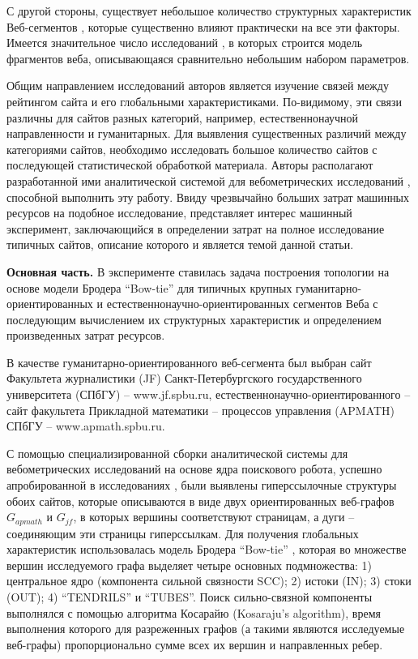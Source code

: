 С другой стороны, существует небольшое количество структурных характеристик Веб-сегментов \cite{ChoRoy}, которые существенно влияют практически на все эти факторы. Имеется значительное число исследований \cite{Kleinberg,ChoRoy,BroderKumarMaghoul,AguilloGranadinoOrtega,StuartThelwallHarries,Chakrabarti,Thelwall,Pechnikov,PechnikovNwohiri}, в которых строится модель фрагментов веба, описывающаяся сравнительно небольшим набором параметров.

Общим направлением исследований авторов является изучение связей между рейтингом сайта и его глобальными характеристиками. По-видимому, эти связи различны для сайтов разных категорий, например, естественнонаучной направленности и гуманитарных. Для выявления существенных различий между категориями сайтов, необходимо исследовать большое количество сайтов с последующей статистической обработкой материала. Авторы располагают разработанной ими аналитической системой для вебометрических исследований \cite{BlekanovSergeevMaksimov,BlekanovSergeevMartynenko}, способной выполнить эту работу. Ввиду чрезвычайно больших затрат машинных ресурсов на подобное исследование, представляет интерес машинный эксперимент, заключающийся в определении затрат на полное исследование типичных сайтов, описание которого и является темой данной статьи.

\textbf{Основная часть.} В эксперименте ставилась задача построения топологии на основе модели Бродера “Bow-tie” \cite{BroderKumarMaghoul,Thelwall} для типичных крупных гуманитарно-ориентированных и естественнонаучно-ориентированных сегментов Веба с последующим вычислением их структурных характеристик и определением произведенных затрат ресурсов.

В качестве гуманитарно-ориентированного веб-сегмента был выбран сайт Факультета журналистики (JF) Санкт-Петербургского государственного университета (СПбГУ) -- www.jf.spbu.ru, естественнонаучно-ориентированного -- сайт факультета Прикладной математики -- процессов управления (APMATH) СПбГУ -- www.apmath.spbu.ru.

С помощью специализированной сборки аналитической системы для вебометрических исследований на основе ядра поискового робота, успешно апробированной в исследованиях \cite{BlekanovSergeev,MaksimovBlekanov} , были выявлены гиперссылочные структуры обоих сайтов, которые описываются в виде двух ориентированных веб-графов \(G_{apmath}\) и \(G_{jf}\), в которых вершины соответствуют страницам, а дуги – соединяющим эти страницы гиперссылкам. Для получения глобальных характеристик использовалась модель Бродера “Bow-tie” \cite{BroderKumarMaghoul} , которая во множестве вершин исследуемого графа выделяет четыре основных подмножества: 1) центральное ядро (компонента сильной связности SCC); 2) истоки (IN); 3) стоки (OUT); 4) “TENDRILS” и “TUBES”. Поиск сильно-связной компоненты выполнялся с помощью алгоритма Косарайю \cite{Sedgewick} (Kosaraju's algorithm), время выполнения которого для разреженных графов (а такими являются исследуемые веб-графы) пропорционально сумме всех их вершин и направленных ребер.

